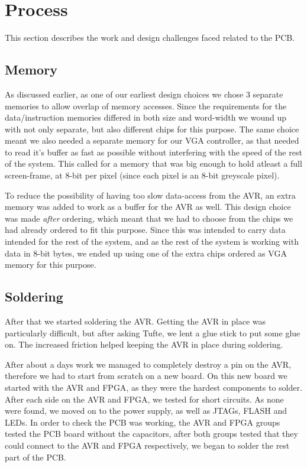 \section {Process}
This section describes the work and design challenges faced related to the PCB.
\subsection{Memory}
As discussed earlier, as one of our earliest design choices we chose 3 separate memories to allow overlap of
memory accesses. Since the requirements for the data/instruction memories differed in both size and word-width 
we wound up with not only separate, but also different chips for this purpose. The same choice meant we also
needed a separate memory for our \ac{VGA} controller, as that needed to read it's buffer as fast as possible
without interfering with the speed of the rest of the system. This called for a memory that was big enough to
hold atleast a full screen-frame, at 8-bit per pixel (since each pixel is an 8-bit greyscale pixel).

To reduce the possibility of having too slow data-access from the AVR, an extra memory was added to work as
a buffer for the AVR as well. This design choice was made {\em after} ordering, which meant that we had to choose from
the chips we had already ordered to fit this purpose. Since this was intended to carry data intended for the rest
of the system, and as the rest of the system is working with data in 8-bit bytes, we ended up using one of the
extra chips ordered as \ac{VGA} memory for this purpose.




\subsection{Soldering}
After that we started soldering the AVR. Getting the AVR in place was particularly difficult,
but after asking Tufte, we lent a glue stick to put some glue on. The increased friction helped keeping the AVR in place during soldering.

After about a days work we managed to completely destroy a pin on the AVR,
therefore we had to start from scratch on a new board. On this new board we
started with the AVR and \ac{FPGA}, as they were the hardest components to
solder. After each side on the AVR and \ac{FPGA}, we tested for short
circuits. As none were found, we moved on to the power supply, as well as
\acp{JTAG}, FLASH and \acp{LED}. In order to check the \ac{PCB} was working, the
AVR and \ac{FPGA} groups tested the \ac{PCB} board without the capacitors, after
both groups tested that they could connect to the AVR and \ac{FPGA}
respectively, we began to solder the rest part of the \ac{PCB}.

